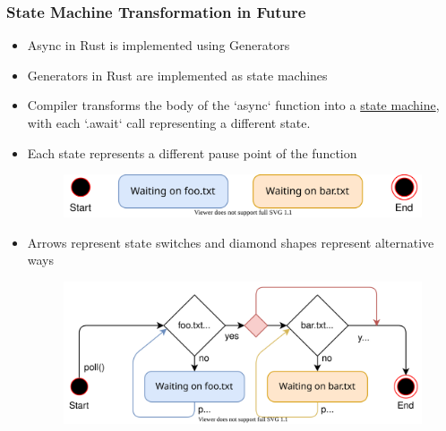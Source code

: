 \begin{frame}[fragile]
    \frametitle{State Machine Transformation in Future}
% 
% 
    \begin{itemize}
        \item Async in Rust is implemented using Generators
        \item Generators in Rust are implemented as state machines
        \item Compiler transforms the body of the `async` function into a \href{https://en.wikipedia.org/wiki/Finite-state_machine}{state machine}, with each `.await` call representing a different state.
        \item Each state represents a different pause point of the function
% 
    \begin{figure}
    \includegraphics[width=0.8\linewidth]{figs/async-state-machine-states.svg}
    \end{figure}
% 
        \item Arrows represent state switches and diamond shapes represent alternative ways
% 
    \begin{figure}
    \includegraphics[width=0.8\linewidth]{figs/async-state-machine-basic.svg}
    \end{figure}
    \end{itemize}
% 
\end{frame}
